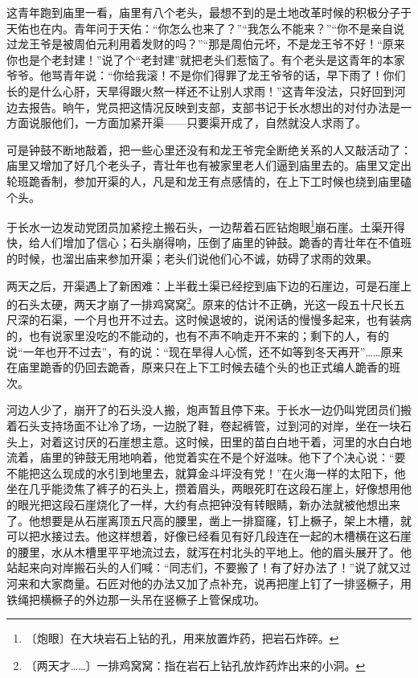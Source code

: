\documentclass[12pt,UTF-8,openany]{ctexbook}
\begin{document}
\begin{large}
    这青年跑到庙里一看，庙里有八个老头，最想不到的是土地改革时候的积极分子于天佑也在内。青年问于天佑：“你怎么也来了？”“我怎么不能来？”“你不是亲自说过龙王爷是被周伯元利用着发财的吗？”“那是周伯元坏，不是龙王爷不好！“原来你也是个老封建！”说了个“老封建”就把老头们惹恼了。有个老头是这青年的本家爷爷。他骂青年说：“你给我滚！不是你们得罪了龙王爷爷的话，早下雨了！你们长的是什么心肝，天旱得跟火熬一样还不让别人求雨！”这青年没法，只好回到河边去报告。晌午，党员把这情况反映到支部，支部书记于长水想出的对付办法是一方面说服他们，一方面加紧开渠——只要渠开成了，自然就没人求雨了。
    
    可是钟鼓不断地敲着，把一些心里还没有和龙王爷完全断绝关系的人又敲活动了：庙里又增加了好几个老头子，青壮年也有被家里老人们逼到庙里去的。庙里又定出轮班跪香制，参加开渠的人，凡是和龙王有点感情的，在上下工时候也绕到庙里磕个头。
    
    于长水一边发动党团员加紧挖土搬石头，一边帮着石匠钻炮眼\footnote{〔炮眼〕在大块岩石上钻的孔，用来放置炸药，把岩石炸碎。}崩石崖。土渠开得快，给人们增加了信心；石头崩得响，压倒了庙里的钟鼓。跪香的青壮年在不值班的时候，也溜出庙来参加开渠；老头们说他们心不诚，妨碍了求雨的效果。
    
    两天之后，开渠遇上了新困难：上半截土渠已经挖到庙下边的石崖边，可是石崖上的石头太硬，两天才崩了一排鸡窝窝\footnote{〔两天才……〕一排鸡窝窝：指在岩石上钻孔放炸药炸出来的小洞。}。原来的估计不正确，光这一段五十尺长五尺深的石渠，一个月也开不过去。这时候退坡的，说闲话的慢慢多起来，也有装病的，也有说家里没吃的不能动的，也有不声不响走开不来的；剩下的人，有的说“一年也开不过去”，有的说：“现在旱得人心慌，还不如等到冬天再开”……原来在庙里跪香的仍回去跪香，原来只在上下工时候去磕个头的也正式编人跪香的班次。
    
    河边人少了，崩开了的石头没人搬，炮声暂且停下来。于长水一边仍叫党团员们搬着石头支持场面不让冷了场，一边脱了鞋，卷起裤管，过到河的对岸，坐在一块石头上，对着这讨厌的石崖想主意。这时候，田里的苗白白地干着，河里的水白白地流着，庙里的钟鼓无用地响着，他觉着实在不是个好滋味。他下了个决心说：“要不能把这么现成的水引到地里去，就算金斗坪没有党！”在火海一样的太阳下，他坐在几乎能烫焦了裤子的石头上，攒着眉头，两眼死盯在这段石崖上，好像想用他的眼光把这段石崖烧化了一样，大约有点把钟没有转眼睛，新办法就被他想出来了。他想要是从石崖离顶五尺高的腰里，凿上一排窟窿，钉上橛子，架上木槽，就可以把水接过去。他这样想着，好像已经看见有好几段连在一起的木槽横在这石崖的腰里，水从木槽里平平地流过去，就泻在村北头的平地上。他的眉头展开了。他站起来向对岸搬石头的人们喊：“同志们，不要搬了！有了好办法了！”说了就又过河来和大家商量。石匠对他的办法又加了点补充，说再把崖上钉了一排竖橛子，用铁绳把横橛子的外边那一头吊在竖橛子上管保成功。
    

\end{large}
\end{document}
